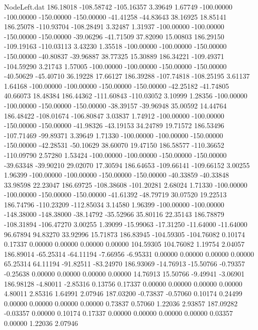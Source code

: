 \begin{filecontents}{NodeLeft.dat}
 186.18018 -108.58742 -105.16357     3.39649    1.67749 -100.00000 -100.00000 -150.00000 -150.00000  -41.41258  -44.83643   38.16925   18.85141
 186.25078 -110.93704 -108.28491     3.32487    1.31937 -100.00000 -100.00000 -150.00000 -150.00000  -39.06296  -41.71509   37.82090   15.00803
 186.29150 -109.19163 -110.03113     3.43230    1.35518 -100.00000 -100.00000 -150.00000 -150.00000  -40.80837  -39.96887   38.77325   15.30889
 186.34221 -109.49371 -104.59290     3.21743    1.57005 -100.00000 -100.00000 -150.00000 -150.00000  -40.50629  -45.40710   36.19228   17.66127
 186.39288 -107.74818 -108.25195     3.61137    1.64168 -100.00000 -100.00000 -150.00000 -150.00000  -42.25182  -41.74805   40.66073   18.48384
 186.44362 -111.60843 -110.03052     3.10999    1.28356 -100.00000 -100.00000 -150.00000 -150.00000  -38.39157  -39.96948   35.00592   14.44764
 186.48422 -108.01674 -106.80847     3.03837    1.74912 -100.00000 -100.00000 -150.00000 -150.00000  -41.98326  -43.19153   34.24789   19.71572
 186.53496 -107.71469  -99.89371     3.39649    1.71330 -100.00000 -100.00000 -150.00000 -150.00000  -42.28531  -50.10629   38.60070   19.47150
 186.58577 -110.36652 -110.09790     2.57280    1.53424 -100.00000 -100.00000 -150.00000 -150.00000  -39.63348  -39.90210   29.02070   17.30594
 186.64653 -109.66141 -109.66152     3.00255    1.96399 -100.00000 -100.00000 -150.00000 -150.00000  -40.33859  -40.33848   33.98598   22.23047
 186.69725 -108.38608 -101.20281     2.68024    1.71330 -100.00000 -100.00000 -150.00000 -150.00000  -41.61392  -48.79719   30.07520   19.22513
 186.74796 -110.23209 -112.85034     3.14580    1.96399 -100.00000 -100.00000 -148.38000 -148.38000  -38.14792  -35.52966   35.80116   22.35143
 186.78879 -108.31894 -106.47270     3.00255    1.39099  -15.99063  -17.31250  -11.64000  -11.64000   96.67894   94.83270   33.92996   15.71873
 186.83945 -104.59305 -104.76082     0.10174    0.17337    0.00000    0.00000    0.00000    0.00000  104.59305  104.76082    1.19754    2.04057
 186.89014  -65.25314  -64.11194    -7.66956   -6.95331    0.00000    0.00000    0.00000    0.00000   65.25314   64.11194  -91.82511  -83.24970
 186.93069  -14.76913  -15.50766    -0.79357   -0.25638    0.00000    0.00000    0.00000    0.00000   14.76913   15.50766   -9.49941   -3.06901
 186.98128   -4.80011   -2.85316     0.13756    0.17337    0.00000    0.00000    0.00000    0.00000    4.80011    2.85316    1.64991    2.07946
 187.03200   -0.73837   -0.57060     0.10174    0.24499    0.00000    0.00000    0.00000    0.00000    0.73837    0.57060    1.22036    2.93857
 187.09282   -0.03357    0.00000     0.10174    0.17337    0.00000    0.00000    0.00000    0.00000    0.03357    0.00000    1.22036    2.07946

\end{filecontents}
